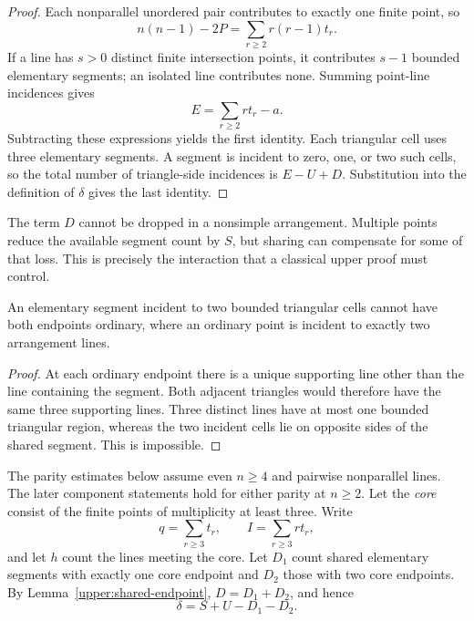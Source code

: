 \begin{proof}
Each nonparallel unordered pair contributes to exactly one finite point, so
\[
 n(n-1)-2P=\sum_{r\ge2}r(r-1)t_r.
\]
If a line has $s>0$ distinct finite intersection points, it contributes $s-1$ bounded elementary segments; an isolated line contributes none. Summing point-line incidences gives
\[
 E=\sum_{r\ge2}r t_r-a.
\]
Subtracting these expressions yields the first identity. Each triangular cell uses three elementary segments. A segment is incident to zero, one, or two such cells, so the total number of triangle-side incidences is $E-U+D$. Substitution into the definition of $\delta$ gives the last identity.
\end{proof}

The term $D$ cannot be dropped in a nonsimple arrangement. Multiple points reduce the available segment count by $S$, but sharing can compensate for some of that loss. This is precisely the interaction that a classical upper proof must control.

\begin{lemma}
\label{upper:shared-endpoint}
An elementary segment incident to two bounded triangular cells cannot have both endpoints ordinary, where an ordinary point is incident to exactly two arrangement lines.
\end{lemma}

\begin{proof}
At each ordinary endpoint there is a unique supporting line other than the line containing the segment. Both adjacent triangles would therefore have the same three supporting lines. Three distinct lines have at most one bounded triangular region, whereas the two incident cells lie on opposite sides of the shared segment. This is impossible.
\end{proof}

The parity estimates below assume even $n\ge4$ and pairwise nonparallel lines. The later component statements hold for either parity at $n\ge2$. Let the \emph{core} consist of the finite points of multiplicity at least three. Write
\[
 q=\sum_{r\ge3}t_r,\qquad I=\sum_{r\ge3}r t_r,
\]
and let $h$ count the lines meeting the core. Let $D_1$ count shared elementary segments with exactly one core endpoint and $D_2$ those with two core endpoints. By Lemma~\ref{upper:shared-endpoint}, $D=D_1+D_2$, and hence
\begin{equation}
 \delta=S+U-D_1-D_2.
 \label{upper:core-identity}
\end{equation}

